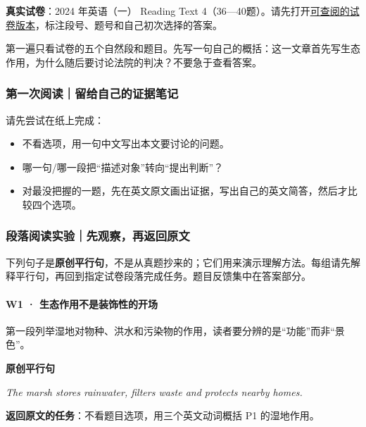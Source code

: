\documentclass[
  11pt,
]{ctexart}
\providecommand{\tightlist}{%
  \setlength{\itemsep}{0pt}\setlength{\parskip}{0pt}}
\renewenvironment{quote}{\begin{tcolorbox}[enhanced,breakable,colback=sand,colframe=primary!22,boxrule=0.4pt,arc=2pt,left=2.6mm,right=2.6mm,top=1.6mm,bottom=1.6mm]\itshape}{\end{tcolorbox}}
\begin{document}
\textbf{真实试卷}：2024 年英语（一） Reading Text
4（36---40题）。请先打开\href{https://ac-wiki.org/general-skills/study/assets/2024-201.pdf}{可查阅的试卷版本}，标注段号、题号和自己初次选择的答案。

第一遍只看试卷的五个自然段和题目。先写一句自己的概括：这一文章首先写生态作用，为什么随后要讨论法院的判决？不要急于查看答案。

\subsubsection{第一次阅读｜留给自己的证据笔记}\label{ux7b2cux4e00ux6b21ux9605ux8bfbux7559ux7ed9ux81eaux5df1ux7684ux8bc1ux636eux7b14ux8bb0}

请先尝试在纸上完成：

\begin{itemize}
\tightlist
\item
  不看选项，用一句中文写出本文要讨论的问题。
\item
  哪一句/哪一段把``描述对象''转向``提出判断''？
\item
  对最没把握的一题，先在英文原文画出证据，写出自己的英文简答，然后才比较四个选项。
\end{itemize}

\subsubsection{段落阅读实验｜先观察，再返回原文}\label{ux6bb5ux843dux9605ux8bfbux5b9eux9a8cux5148ux89c2ux5bdfux518dux8fd4ux56deux539fux6587}

下列句子是\textbf{原创平行句}，不是从真题抄来的；它们用来演示理解方法。每组请先解释平行句，再回到指定试卷段落完成任务。题目反馈集中在答案部分。

\paragraph{W1 ·
生态作用不是装饰性的开场}\label{w1-ux751fux6001ux4f5cux7528ux4e0dux662fux88c5ux9970ux6027ux7684ux5f00ux573a}

第一段列举湿地对物种、洪水和污染物的作用，读者要分辨的是``功能''而非``景色''。

\textbf{原创平行句}

\begin{quote}
The marsh stores rainwater, filters waste and protects nearby homes.
\end{quote}

\textbf{返回原文的任务}：不看题目选项，用三个英文动词概括 P1
的湿地作用。
\end{document}
